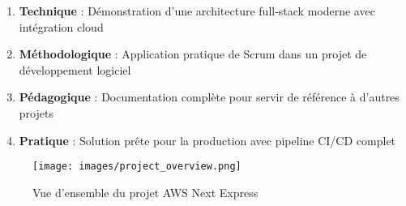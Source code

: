 \begin{enumerate}
    \item \textbf{Technique} : Démonstration d'une architecture full-stack moderne avec intégration cloud
    \item \textbf{Méthodologique} : Application pratique de Scrum dans un projet de développement logiciel
    \item \textbf{Pédagogique} : Documentation complète pour servir de référence à d'autres projets
    \item \textbf{Pratique} : Solution prête pour la production avec pipeline CI/CD complet
\end{enumerate}

\begin{figure}[H]
    \centering
    \texttt{[image: images/project\_overview.png]}
    \caption{Vue d'ensemble du projet AWS Next Express}
    \label{fig:project_overview}
\end{figure} 